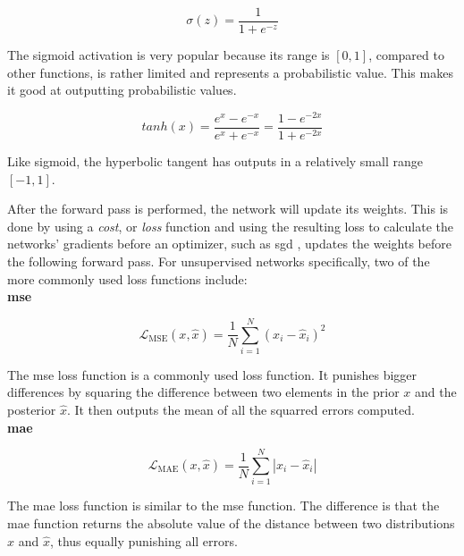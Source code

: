 \begin{equation}
    \sigma(z) = \frac{1} {1 + e^{-z}}
\end{equation}

The sigmoid activation is very popular because its range is $[0,1]$, compared to other functions, is rather limited and represents a probabilistic value. This makes it good at outputting probabilistic values.

\begin{equation}
    tanh(x) = \frac{e^x - e^{-x}}{e^x + e^{-x}} = \frac{1 - e^{-2x}}{1 + e^{-2x}}
\end{equation}

Like sigmoid, the hyperbolic tangent has outputs in a relatively small range $[-1, 1]$.

After the forward pass is performed, the network will update its weights. This is done by using a \textit{cost}, or \textit{loss} function and using the resulting loss to calculate the networks' gradients before an optimizer, such as \acrfull{sgd} \cite{Rumelhart1986, Bottou2012}, updates the weights before the following forward pass. For unsupervised networks specifically, two of the more commonly used loss functions include: \\

\textbf{\acrfull{mse}}

\begin{equation}\label{eq:mse}
    \mathcal{L}_{\text{MSE}}(x, \hat{x}) = \dfrac{1}{N}  \sum_{i=1}^{N}(x_i-\hat{x}_i)^2
\end{equation}

The \acrshort{mse} loss function is a commonly used loss function. It punishes bigger differences by squaring the difference between two elements in the prior $x$ and the posterior $\hat{x}$. It then outputs the mean of all the squarred errors computed. \\

\textbf{\acrfull{mae}}

\begin{equation}\label{eq:mae}
    \mathcal{L}_{\text{MAE}}(x, \hat{x}) = \dfrac{1}{N}  \sum_{i=1}^{N}|x_i-\hat{x}_i|
\end{equation}

The \acrshort{mae} loss function is similar to the \acrshort{mse} function. The difference is that the \acrshort{mae} function returns the absolute value of the distance between two distributions $x$ and $\hat{x}$, thus equally punishing all errors. \\


